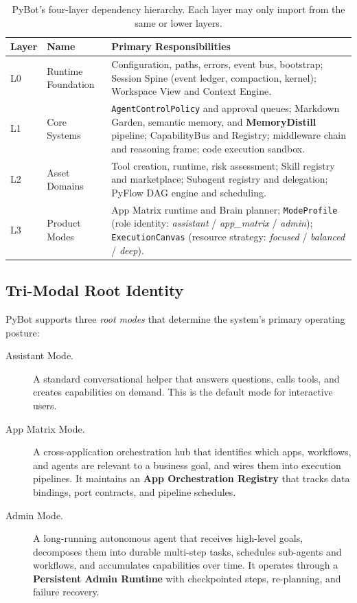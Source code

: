 \documentclass[11pt,a4paper]{article}
\begin{document}
\begin{table}[h]
\centering
\small
\begin{tabularx}{\textwidth}{llX}
\toprule
\textbf{Layer} & \textbf{Name} & \textbf{Primary Responsibilities} \\
\midrule
L0 & Runtime Foundation & Configuration, paths, errors, event bus, bootstrap; Session Spine (event ledger, compaction, kernel); Workspace View and Context Engine. \\
L1 & Core Systems & \texttt{AgentControlPolicy} and approval queues; Markdown Garden, semantic memory, and \textbf{MemoryDistill} pipeline; CapabilityBus and Registry; middleware chain and reasoning frame; code execution sandbox. \\
L2 & Asset Domains & Tool creation, runtime, risk assessment; Skill registry and marketplace; Subagent registry and delegation; PyFlow DAG engine and scheduling. \\
L3 & Product Modes & App Matrix runtime and Brain planner; \texttt{ModeProfile} (role identity: \textit{assistant} / \textit{app\_matrix} / \textit{admin}); \texttt{ExecutionCanvas} (resource strategy: \textit{focused} / \textit{balanced} / \textit{deep}). \\
\bottomrule
\end{tabularx}
\caption{PyBot's four-layer dependency hierarchy. Each layer may only import from the same or lower layers.}
\label{tab:layers}
\end{table}

\subsection{Tri-Modal Root Identity}

PyBot supports three \emph{root modes} that determine the system's primary operating posture:

\begin{description}
  \item[Assistant Mode.] A standard conversational helper that answers questions, calls tools, and creates capabilities on demand. This is the default mode for interactive users.
  \item[App Matrix Mode.] A cross-application orchestration hub that identifies which apps, workflows, and agents are relevant to a business goal, and wires them into execution pipelines. It maintains an \textbf{App Orchestration Registry} that tracks data bindings, port contracts, and pipeline schedules.
  \item[Admin Mode.] A long-running autonomous agent that receives high-level goals, decomposes them into durable multi-step tasks, schedules sub-agents and workflows, and accumulates capabilities over time. It operates through a \textbf{Persistent Admin Runtime} with checkpointed steps, re-planning, and failure recovery.
\end{description}
\end{document}
